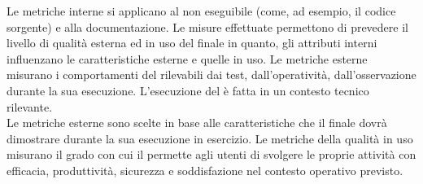 		Le metriche interne si applicano al  non eseguibile (come, ad esempio, il codice sorgente) e alla documentazione. Le misure effettuate permettono di prevedere il livello di qualità esterna ed in uso del  finale in quanto, gli attributi interni influenzano le caratteristiche esterne e quelle in uso.
		Le metriche esterne misurano i comportamenti del   rilevabili dai test, dall'operatività, dall'osservazione durante la sua esecuzione. L'esecuzione del   è fatta in un contesto tecnico rilevante.\\
		Le metriche esterne sono scelte in base alle caratteristiche che il  finale dovrà dimostrare durante la sua esecuzione in esercizio.
		Le metriche della qualità in uso misurano il grado con cui il   permette agli utenti di svolgere le proprie attività con efficacia, produttività, sicurezza e soddisfazione nel contesto operativo previsto.
